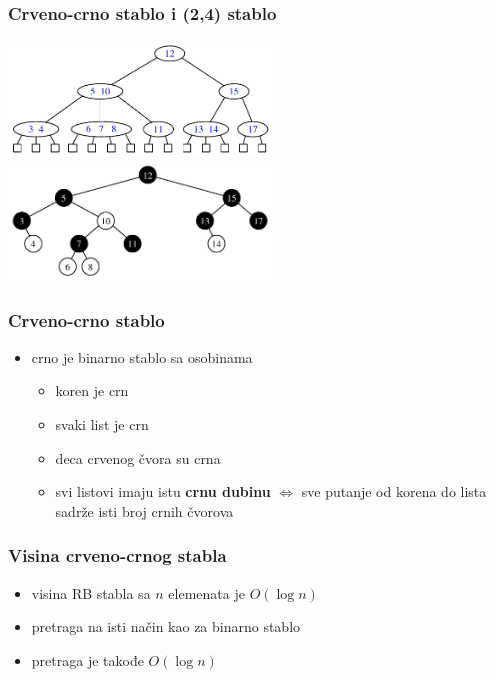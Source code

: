 \documentclass[compress]{beamer}
\begin{document}
\begin{frame}[fragile]
  \frametitle{Crveno-crno stablo i (2,4) stablo}
  \begin{center}
    \includegraphics[width=7cm]{asp-11-pic30.pdf} \\
    \includegraphics[width=7cm]{asp-11-pic38.pdf}
  \end{center}
\end{frame}

\begin{frame}[fragile]
  \frametitle{Crveno-crno stablo}
  \begin{itemize}
    \item {}crno  je binarno stablo sa osobinama
    \begin{itemize}
      \item koren je crn
      \item svaki list je crn
      \item deca crvenog čvora su crna
      \item svi listovi imaju istu \textbf{crnu dubinu} $\Leftrightarrow$ sve putanje od korena do lista sadrže isti broj crnih čvorova
    \end{itemize}
  \end{itemize}
\end{frame}

\begin{frame}[fragile]
  \frametitle{Visina crveno-crnog stabla}
  \begin{itemize}
    \item visina RB stabla sa $n$ elemenata je $O(\log n)$
    \item pretraga na isti način kao za binarno stablo
    \item pretraga je takođe $O(\log n)$
  \end{itemize}
\end{frame}
\end{document}
